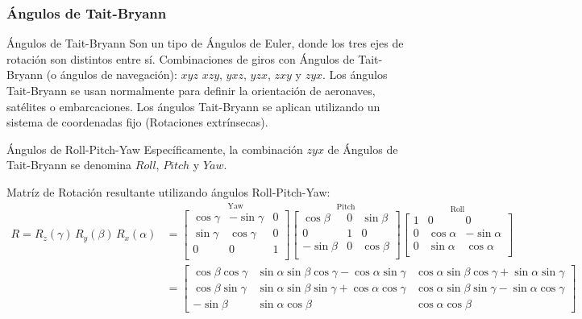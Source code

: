 \begin{frame}
    \frametitle{Ángulos de Tait-Bryann}
    \small
    \begin{block}{Ángulos de Tait-Bryann}
        Son un tipo de Ángulos de Euler, donde los tres ejes de rotación son distintos entre sí. Combinaciones de giros con Ángulos de Tait-Bryann (o ángulos de navegación): $xyz$ $xzy$, $yxz$, $yzx$, $zxy$ y $zyx$. Los ángulos Tait-Bryann se usan normalmente para definir la orientación de aeronaves, satélites o embarcaciones. Los ángulos Tait-Bryann se aplican utilizando un sistema de coordenadas fijo (Rotaciones extrínsecas).
    \end{block}
    
    \begin{block}{Ángulos de Roll-Pitch-Yaw}
        Específicamente, la combinación $zyx$ de Ángulos de Tait-Bryann se denomina $Roll$, $Pitch$ y $Yaw$.
    \end{block}
    
    Matríz de Rotación resultante utilizando ángulos Roll-Pitch-Yaw:
    \scriptsize
    \begin{align*}
        R = R_{z}(\gamma) \, R_{y}(\beta) \, R_{x}(\alpha) &=
        \overset {\text{Yaw}}{
        \begin{bmatrix}
            \cos \gamma & -\sin \gamma & 0\\
            \sin \gamma & \cos \gamma &0\\
            0 & 0 & 1\\
        \end{bmatrix}}
        \overset {\text{Pitch}}{
        \begin{bmatrix}
            \cos \beta &0&\sin \beta\\
            0 & 1 & 0\\
            -\sin \beta &0&\cos \beta\\
        \end{bmatrix}}
        \overset {\text{Roll}}{
        \begin{bmatrix}
            1 & 0 & 0 \\
            0 & \cos \alpha & -\sin \alpha \\
            0& \sin \alpha & \cos \alpha \\
        \end{bmatrix}}\\
        &=
        \begin{bmatrix}
            \cos \beta \cos \gamma & \sin \alpha \sin \beta \cos \gamma - \cos \alpha \sin \gamma & \cos \alpha \sin \beta \cos \gamma + \sin \alpha \sin \gamma \\
            \cos \beta \sin \gamma & \sin \alpha \sin \beta \sin \gamma + \cos \alpha \cos \gamma & \cos \alpha \sin \beta \sin \gamma - \sin \alpha \cos \gamma \\
            -\sin \beta & \sin \alpha \cos \beta & \cos \alpha \cos \beta
        \end{bmatrix}
    \end{align*}
    

\end{frame}
